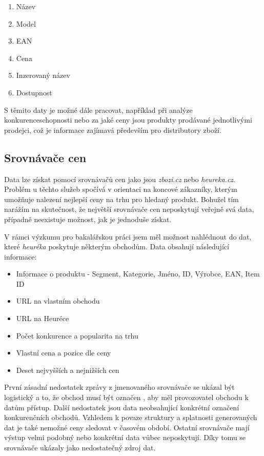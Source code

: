 \documentclass[thesis=B,czech]{FITthesis}[2012/06/26]
\begin{document}
\begin{enumerate}
\item Název
\item Model
\item EAN
\item Cena
\item Inzerovaný název
\item Dostupnost
\end{enumerate}

S těmito daty je možné dále pracovat, například při analýze konkurenceschopnosti nebo za jaké ceny jsou produkty prodávané
jednotlivými prodejci, což je informace zajímavá především pro distributory zboží. \cite{hunka}

\subsection{Srovnávače cen}

Data lze získat pomocí srovnávačů cen jako jsou \textit{zbozi.cz}\cite{heureka} 
nebo \textit{heureka.cz}\cite{zbozi}. Problém u těchto služeb spočívá v orientaci na koncové zákazníky, kterým umožňuje
nalezení nejlepší ceny na trhu pro hledaný produkt. Bohužel tím narážím na skutečnost, že největší srovnávače cen neposkytují veřejně 
svá data, případně neexistuje možnost, jak je jednoduše získat. 
\par
V rámci výzkumu pro bakalářskou práci jsem měl možnost nahlédnout do dat, které \textit{heuréka} poskytuje některým obchodům. \cite{hunka}
Data obsahují následující informace:

\begin{itemize}
\item Informace o produktu - Segment, Kategorie, Jméno, ID, Výrobce, EAN, Item ID
\item URL na vlastním obchodu
\item URL na Heuréce
\item Počet konkurence a popularita na trhu
\item Vlastní cena a pozice dle ceny
\item Deset nejvyšších a nejnižších cen
\end{itemize}

První zásadní nedostatek zprávy z jmenovaného srovnávače se ukázal být logistický a to, že obchod musí být označen ,
aby měl provozovatel obchodu k datům přístup. Další nedostatek jsou data neobsahující konkrétní označení konkurenčních obchodů.\cite{heureka-report}
Vzhledem k povaze struktury a splatnosti generovaných dat je také nemožné ceny sledovat v časovém období.
Ostatní srovnávače mají výstup velmi podobný nebo konkrétní data vůbec neposkytují. Díky tomu se srovnávače ukázaly jako nedostatečný zdroj dat.\cite{hunka}
\end{document}
